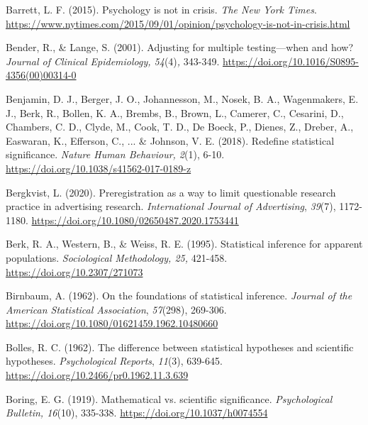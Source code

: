 \documentclass[authordate, empirical]{jote-new-article}
\begin{document}
	Barrett, L. F. (2015). Psychology is not in crisis. \emph{The New York Times}. \href{https://www.nytimes.com/2015/09/01/opinion/psychology-is-not-in-crisis.html}{https://www.nytimes.com/2015/09/01/opinion/psychology-is-not-in-crisis.html}



	Bender, R., \& Lange, S. (2001). Adjusting for multiple testing—when and how? \emph{Journal of Clinical Epidemiology, 54}(4)\emph{, }343-349. \href{https://doi.org/10.1016/S0895-4356(00)00314-0}{https://doi.org/10.1016/S0895-4356(00)00314-0}



	Benjamin, D. J., Berger, J. O., Johannesson, M., Nosek, B. A., Wagenmakers, E. J., Berk, R., Bollen, K. A., Brembs, B., Brown, L., Camerer, C., Cesarini, D., Chambers, C. D., Clyde, M., Cook, T. D., De Boeck, P., Dienes, Z., Dreber, A., Easwaran, K., Efferson, C., ... \& Johnson, V. E. (2018). Redefine statistical significance. \emph{Nature Human Behaviour, 2}(1), 6-10. \href{https://doi.org/10.1038/s41562-017-0189-z}{https://doi.org/10.1038/s41562-017-0189-z}



	Bergkvist, L. (2020). Preregistration as a way to limit questionable research practice in advertising research. \emph{International Journal of Advertising}, \emph{39}(7), 1172-1180. \href{https://doi.org/10.1080/02650487.2020.1753441}{https://doi.org/10.1080/02650487.2020.1753441}



	Berk, R. A., Western, B., \& Weiss, R. E. (1995). Statistical inference for apparent populations. \emph{Sociological Methodology, 25,} 421-458. \href{https://doi.org/10.2307/271073}{https://doi.org/10.2307/271073}



	Birnbaum, A. (1962). On the foundations of statistical inference. \emph{Journal of the American Statistical Association}, \emph{57}(298), 269-306. \href{https://doi.org/10.1080/01621459.1962.10480660}{https://doi.org/10.1080/01621459.1962.10480660}



	Bolles, R. C. (1962). The difference between statistical hypotheses and scientific hypotheses. \emph{Psychological Reports}, \emph{11}(3), 639-645. \href{https://doi.org/10.2466/pr0.1962.11.3.639}{https://doi.org/10.2466/pr0.1962.11.3.639}



	Boring, E. G. (1919). Mathematical vs. scientific significance. \emph{Psychological Bulletin, 16}(10), 335-338. \href{https://doi.org/10.1037/h0074554}{https://doi.org/10.1037/h0074554}
\end{document}
